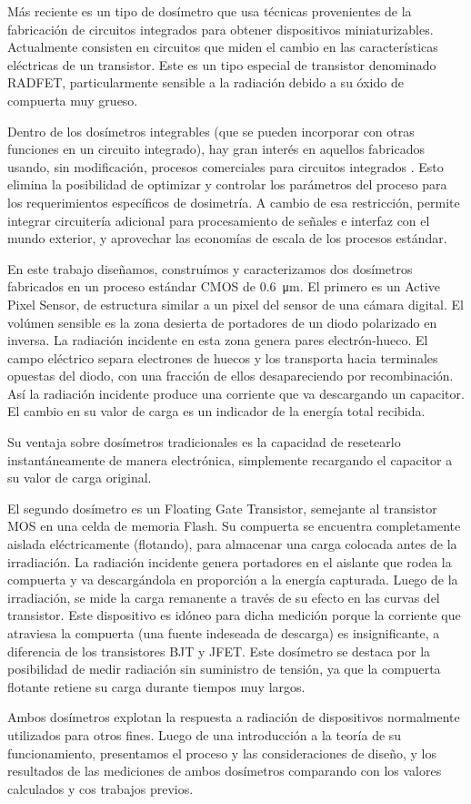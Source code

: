 Más reciente es un tipo de dosímetro que usa técnicas 
provenientes de la fabricación de circuitos integrados 
para obtener dispositivos 
miniaturizables\cite{holmes-siedle_radfet:_1986}.
Actualmente consisten en circuitos que miden el 
cambio en las características eléctricas de un transistor.
Este es un tipo especial de transistor denominado RADFET,
particularmente sensible a la radiación 
debido a su óxido de compuerta muy grueso.

Dentro de los dosímetros integrables 
(que se pueden incorporar con otras funciones en un circuito integrado),
hay gran interés en aquellos fabricados usando, sin modificación,
procesos comerciales para circuitos integrados\cite{lipovetzky_field_2013}
\cite{wang_temperature_2005}
\cite{garcia-moreno_floating_2012}
\cite{dulinski_cmos_2004}.
Esto elimina la posibilidad de optimizar y controlar 
los parámetros del proceso 
para los requerimientos específicos de dosimetría.
A cambio de esa restricción, 
permite integrar circuitería adicional
para procesamiento de señales e interfaz con el mundo exterior,
y aprovechar las economías de escala de los procesos estándar.

En este trabajo diseñamos, construímos y caracterizamos
dos dosímetros fabricados en un proceso estándar CMOS de
\SI{0.6}{\micro\meter}.
El primero es un Active Pixel Sensor,
de estructura similar a un pixel del sensor de una cámara digital.
El volúmen sensible es la zona desierta de portadores 
de un diodo polarizado en inversa.
La radiación incidente en esta zona genera pares electrón-hueco.
El campo eléctrico separa electrones de huecos y los transporta hacia
terminales opuestas del diodo,
con una fracción de ellos desapareciendo por recombinación.
Así la radiación incidente produce una corriente que va
descargando un capacitor.
El cambio en su valor de carga es un indicador de la energía total recibida.

Su ventaja sobre dosímetros tradicionales es la capacidad de resetearlo
instantáneamente de manera electrónica,
simplemente recargando el capacitor a su valor de carga original.

El segundo dosímetro es un Floating Gate Transistor,
semejante al transistor MOS en una celda de memoria Flash.
Su compuerta se encuentra completamente aislada eléctricamente (flotando),
para almacenar una carga colocada antes de la irradiación.
La radiación incidente genera portadores en el aislante que rodea la compuerta
y va descargándola en proporción a la energía capturada.
Luego de la irradiación,
se mide la carga remanente a través de su efecto en las curvas del transistor.
Este dispositivo es idóneo para dicha medición
porque la corriente que atraviesa la compuerta 
(una fuente indeseada de descarga) es insignificante,
a diferencia de los transistores BJT y JFET.
Este dosímetro se destaca por la posibilidad de medir radiación sin suministro
de tensión, ya que la compuerta flotante retiene su carga durante tiempos muy
largos.

Ambos dosímetros explotan la respuesta a radiación de dispositivos 
normalmente utilizados para otros fines. 
Luego de una introducción a la teoría de su funcionamiento,
presentamos el proceso y las consideraciones de diseño,
y los resultados de las mediciones de ambos dosímetros 
comparando con los valores calculados y cos trabajos previos.

